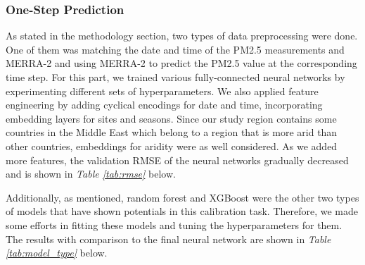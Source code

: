 \documentclass[draft]{agujournal2019}
\begin{document}
\subsubsection{One-Step Prediction}

As stated in the methodology section, two types of data preprocessing were done. One of them was matching the date and time of the PM2.5 measurements and MERRA-2 and using MERRA-2 to predict the PM2.5 value at the corresponding time step. For this part, we trained various fully-connected neural networks by experimenting different sets of hyperparameters. We also applied feature engineering by adding cyclical encodings for date and time, incorporating embedding layers for sites and seasons. Since our study region contains some countries in the Middle East which belong to a region that is more arid than other countries, embeddings for aridity were as well considered. As we added more features, the validation RMSE of the neural networks gradually decreased and is shown in \textit{Table \ref{tab:rmse}} below.

Additionally, as mentioned, random forest and XGBoost were the other two types of models that have shown potentials in this calibration task. Therefore, we made some efforts in fitting these models and tuning the hyperparameters for them. The results with comparison to the final neural network are shown in \textit{Table \ref{tab:model_type}} below.
\end{document}
